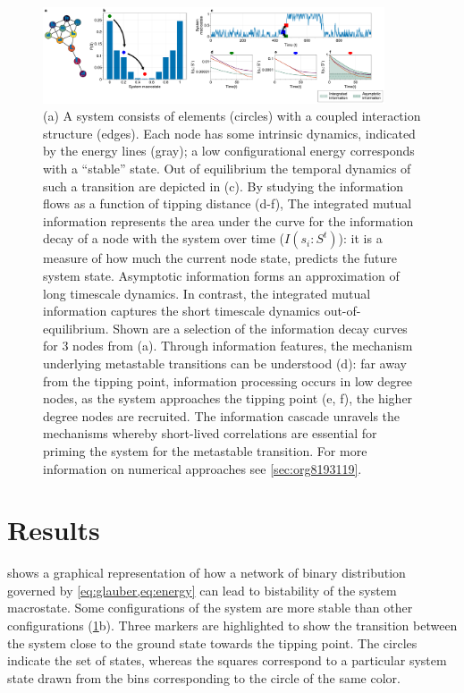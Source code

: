 \documentclass[a4paper, 11pt, twocolumn]{article}
\begin{document}
\begin{figure}
\centering
\includegraphics[width=0.9\textwidth]{./figures/figure1.pdf}
\caption{\label{fig:introduction}(a) A system consists of elements (circles) with a coupled interaction structure (edges). Each node has some intrinsic dynamics, indicated by the energy lines (gray); a low configurational energy corresponds with a ``stable'' state. Out of equilibrium the temporal dynamics of such a transition are depicted in (c). By studying the information flows as a function of tipping distance (d-f), The integrated mutual information represents the area under the curve for the information decay of a node with the system over time ($I(s_i : S^t)$): it is a measure of how much the current node state, predicts the future system state. Asymptotic information forms an approximation of long timescale dynamics. In contrast, the integrated mutual information captures the short timescale dynamics out-of-equilibrium. Shown are a selection of the information decay curves for 3 nodes from (a). Through information features, the mechanism underlying metastable transitions can be understood (d): far away from the tipping point, information processing occurs in low degree nodes, as the system approaches the tipping point (e, f), the higher degree nodes are recruited. The information cascade unravels the mechanisms whereby short-lived correlations are essential for priming the system for the metastable transition. For more information on numerical approaches see \ref{sec:org8193119}.}
\end{figure}

\section{Results}
\label{sec:org6f0b033}

 shows a graphical representation of how a network of binary distribution governed by \cref{eq:glauber,eq:energy} can lead to bistability of the system macrostate. Some configurations of the system are more stable than other configurations (\cref{fig:introduction}{b}). Three markers are highlighted to show the transition between the system close to the ground state towards the tipping point. The circles indicate the set of states, whereas the squares correspond to a particular system state drawn from the bins corresponding to the circle of the same color.
\end{document}
